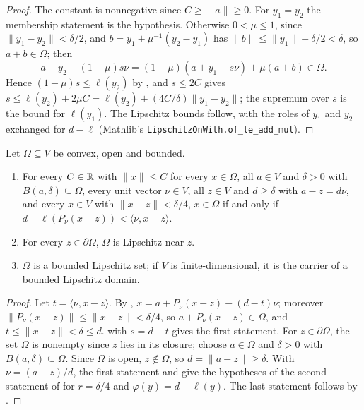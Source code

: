 \begin{proof}
\leanok
The constant is nonnegative since $C \geq \|a\| \geq 0$. For $y_1 = y_2$ the membership statement
is the hypothesis. Otherwise $0 < \mu \leq 1$, since $\|y_1 - y_2\| < \delta/2$, and
$b = y_1 + \mu^{-1}(y_2 - y_1)$ has $\|b\| \leq \|y_1\| + \delta/2 < \delta$, so
$a + b \in \Omega$; then
\[
  a + y_2 - (1 - \mu) s \nu = (1 - \mu)(a + y_1 - s\nu) + \mu (a + b) \in \Omega .
\]
Hence $(1 - \mu) s \leq \ell(y_2)$ by , and $s \leq 2C$ gives
$s \leq \ell(y_2) + 2\mu C = \ell(y_2) + (4C/\delta)\|y_1 - y_2\|$; the supremum over $s$ is the
bound for $\ell(y_1)$. The Lipschitz bounds follow, with the roles of $y_1$ and $y_2$ exchanged for
$d - \ell$ (Mathlib's
\texttt{LipschitzOnWith.\allowbreak of\_\allowbreak le\_\allowbreak add\_\allowbreak mul}).
\end{proof}

\begin{theorem}
\label{thm:convex-lipschitz}
\leanok
{}
Let $\Omega \subseteq V$ be convex, open and bounded.
\begin{enumerate}
  \item For every $C \in \mathbb{R}$ with $\|x\| \leq C$ for every $x \in \Omega$, all $a \in V$ and
    $\delta > 0$ with $B(a, \delta) \subseteq \Omega$, every unit vector $\nu \in V$, all $z \in V$
    and $d \geq \delta$ with $a - z = d\nu$, and every $x \in V$ with $\|x - z\| < \delta/4$,
    $x \in \Omega$ if and only if $d - \ell(P_\nu(x - z)) < \langle \nu, x - z \rangle$.
  \item For every $z \in \partial\Omega$, $\Omega$ is Lipschitz near $z$.
  \item $\Omega$ is a bounded Lipschitz set; if $V$ is finite-dimensional, it is the carrier of a
    bounded Lipschitz domain.
\end{enumerate}
\end{theorem}

\begin{proof}
\leanok
Let $t = \langle \nu, x - z \rangle$. By ,
$x = a + P_\nu(x - z) - (d - t)\nu$; moreover $\|P_\nu(x - z)\| \leq \|x - z\| < \delta/4$, so
$a + P_\nu(x - z) \in \Omega$, and $t \leq \|x - z\| < \delta \leq d$.  with
$s = d - t$ gives the first statement. For $z \in \partial\Omega$, the set $\Omega$ is nonempty
since $z$ lies in its closure; choose $a \in \Omega$ and $\delta > 0$ with $B(a, \delta) \subseteq
\Omega$. Since $\Omega$ is open, $z \notin \Omega$, so $d = \|a - z\| \geq \delta$. With
$\nu = (a - z)/d$, the first statement and  give the hypotheses of
the second statement of  for $r = \delta/4$ and
$\varphi(y) = d - \ell(y)$. The last statement follows by .
\end{proof}

